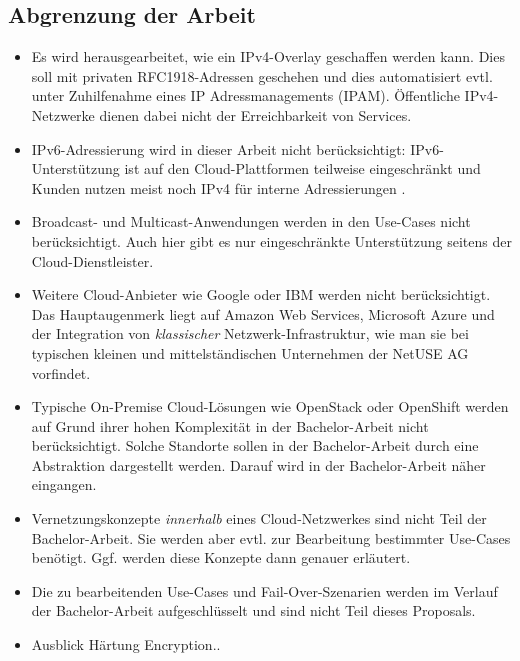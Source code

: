 \subsection{Abgrenzung der Arbeit}

\begin{itemize}
\item Es wird herausgearbeitet, wie ein IPv4-Overlay geschaffen werden kann. Dies soll mit privaten RFC1918-Adressen geschehen und dies automatisiert evtl. unter Zuhilfenahme eines IP Adressmanagements (IPAM). Öffentliche IPv4-Netzwerke dienen dabei nicht der Erreichbarkeit von Services.
\item IPv6-Adressierung wird in dieser Arbeit nicht berücksichtigt: IPv6-Unterstützung ist auf den Cloud-Plattformen teilweise eingeschränkt und Kunden nutzen meist noch IPv4 für interne Adressierungen \cite{azureipv6_2020}.
\item Broadcast- und Multicast-Anwendungen werden in den Use-Cases nicht berücksichtigt. Auch hier gibt es nur eingeschränkte Unterstützung seitens der Cloud-Dienstleister.
\item Weitere Cloud-Anbieter wie Google oder IBM werden nicht berücksichtigt. Das Hauptaugenmerk liegt auf Amazon Web Services, Microsoft Azure und der Integration von \textit{klassischer} Netzwerk-Infrastruktur, wie man sie bei typischen kleinen und mittelständischen Unternehmen der NetUSE AG vorfindet.
\item Typische On-Premise Cloud-Lösungen wie OpenStack oder OpenShift werden auf Grund ihrer hohen Komplexität in der Bachelor-Arbeit nicht berücksichtigt. Solche Standorte sollen in der Bachelor-Arbeit durch eine Abstraktion dargestellt werden. Darauf wird in der Bachelor-Arbeit näher eingangen.
\item Vernetzungskonzepte \textit{innerhalb} eines Cloud-Netzwerkes sind nicht Teil der Bachelor-Arbeit. Sie werden aber evtl. zur Bearbeitung bestimmter Use-Cases benötigt. Ggf. werden diese Konzepte dann genauer erläutert.
\item Die zu bearbeitenden Use-Cases und Fail-Over-Szenarien werden im Verlauf der Bachelor-Arbeit aufgeschlüsselt und sind nicht Teil dieses Proposals.
\item Ausblick Härtung Encryption..

\end{itemize}
